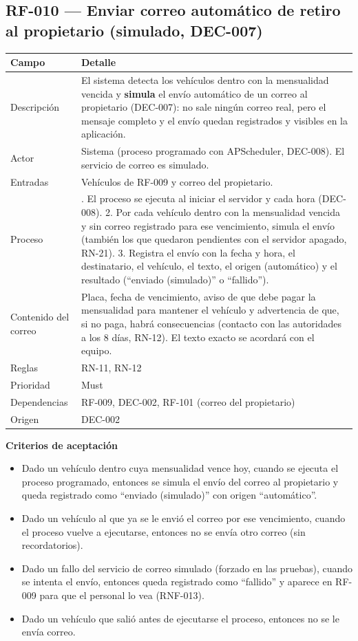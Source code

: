 \subsection{RF-010 — Enviar correo automático de retiro al propietario (simulado, DEC-007)}
\begin{longtable}{>{\raggedright\arraybackslash}p{3.2cm}>{\raggedright\arraybackslash}p{11.2cm}}
\toprule
\textbf{Campo} & \textbf{Detalle}\\
\midrule\endhead
Descripción & El sistema detecta los vehículos dentro con la mensualidad vencida y \textbf{simula} el envío automático de un correo al propietario (DEC-007): no sale ningún correo real, pero el mensaje completo y el envío quedan registrados y visibles en la aplicación.\\
Actor & Sistema (proceso programado con APScheduler, DEC-008). El servicio de correo es simulado.\\
Entradas & Vehículos de RF-009 y correo del propietario.\\
Proceso & 1. El proceso se ejecuta al iniciar el servidor y cada hora (DEC-008). 2. Por cada vehículo dentro con la mensualidad vencida y sin correo registrado para ese vencimiento, simula el envío (también los que quedaron pendientes con el servidor apagado, RN-21). 3. Registra el envío con la fecha y hora, el destinatario, el vehículo, el texto, el origen (automático) y el resultado (``enviado (simulado)'' o ``fallido'').\\
Contenido del correo & Placa, fecha de vencimiento, aviso de que debe pagar la mensualidad para mantener el vehículo y advertencia de que, si no paga, habrá consecuencias (contacto con las autoridades a los 8 días, RN-12). El texto exacto se acordará con el equipo.\\
Reglas & RN-11, RN-12\\
Prioridad & Must\\
Dependencias & RF-009, DEC-002, RF-101 (correo del propietario)\\
Origen & [U] DEC-002\\
\bottomrule
\end{longtable}

\textbf{Criterios de aceptación}
\begin{itemize}
  \item Dado un vehículo dentro cuya mensualidad vence hoy, cuando se ejecuta el proceso programado, entonces se simula el envío del correo al propietario y queda registrado como ``enviado (simulado)'' con origen ``automático''.
  \item Dado un vehículo al que ya se le envió el correo por ese vencimiento, cuando el proceso vuelve a ejecutarse, entonces no se envía otro correo (sin recordatorios).
  \item Dado un fallo del servicio de correo simulado (forzado en las pruebas), cuando se intenta el envío, entonces queda registrado como ``fallido'' y aparece en RF-009 para que el personal lo vea (RNF-013).
  \item Dado un vehículo que salió antes de ejecutarse el proceso, entonces no se le envía correo.
\end{itemize}

